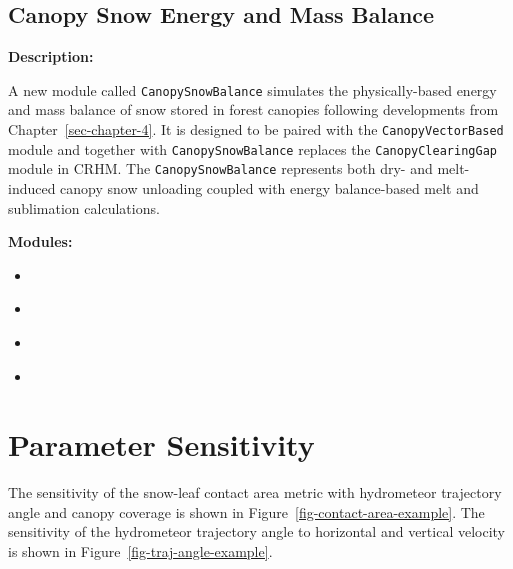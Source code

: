 \documentclass[
  letterpaper,
]{tex/uofsthesis-cs}
\providecommand{\tightlist}{%
  \setlength{\itemsep}{0pt}\setlength{\parskip}{0pt}}
\begin{document}
\subsection{Canopy Snow Energy and Mass
Balance}\label{canopy-snow-energy-and-mass-balance}

\textbf{Description:}

A new module called \texttt{CanopySnowBalance} simulates the
physically-based energy and mass balance of snow stored in forest
canopies following developments from Chapter~\ref{sec-chapter-4}. It is
designed to be paired with the \texttt{CanopyVectorBased} module and
together with \texttt{CanopySnowBalance} replaces the
\texttt{CanopyClearingGap} module in CRHM. The
\texttt{CanopySnowBalance} represents both dry- and melt-induced canopy
snow unloading coupled with energy balance-based melt and sublimation
calculations.

\textbf{Modules:}

\begin{itemize}
\tightlist
\item
  \href{https://github.com/acebulsk/crhmcode/blob/alex-ceb-thesis-changes/crhmcode/src/modules/ClassCanopySnowBalanceCRHM.cpp}{\color{blue}{ClassCanopySnowBalanceCRHM.cpp}}
\item
  \href{https://github.com/acebulsk/crhmcode/blob/alex-ceb-thesis-changes/crhmcode/src/modules/ClassCanopySnowBalanceCRHM.h}{\color{blue}{ClassCanopySnowBalanceCRHM.h}}
\item
  \href{https://github.com/acebulsk/crhmcode/blob/alex-ceb-thesis-changes/crhmcode/src/modules/ClassCanopySnowBalanceBase.cpp}{\color{blue}{ClassCanopySnowBalanceBase.cpp}}
\item
  \href{https://github.com/acebulsk/crhmcode/blob/alex-ceb-thesis-changes/crhmcode/src/modules/ClassCanopySnowBalanceBase.h}{\color{blue}{ClassCanopySnowBalanceBase.h}}
\end{itemize}

\section{Parameter Sensitivity}\label{parameter-sensitivity}

The sensitivity of the snow-leaf contact area metric with hydrometeor
trajectory angle and canopy coverage is shown in
Figure~\ref{fig-contact-area-example}. The sensitivity of the
hydrometeor trajectory angle to horizontal and vertical velocity is
shown in Figure~\ref{fig-traj-angle-example}.
\end{document}
